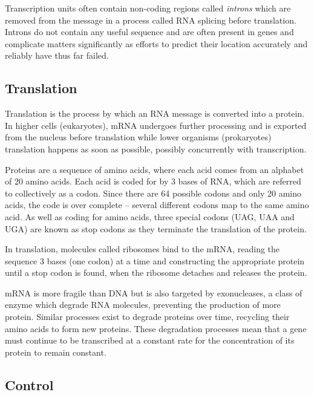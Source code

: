 Transcription units often contain non-coding regions called \textit{introns}
which are removed from the message in a process called RNA splicing 
before translation.
Introns do not contain any useful sequence and are often present in genes and
complicate matters significantly as efforts to predict their location 
accurately and reliably have thus far failed.

\subsection{Translation}
\label{sec:translation}

Translation is the process by which an RNA message is converted into a protein.
In higher cells (eukaryotes), mRNA undergoes further processing and is exported
from the nucleus before translation while lower organisms (prokaryotes)
translation happens as soon as possible, possibly concurrently with
transcription.

Proteins are a sequence of amino acids, where each acid comes from an alphabet
of 20 amino acids.
Each acid is coded for by 3 bases of RNA, which are referred to collectively 
as a codon.
Since there are 64 possible codons and only 20 amino acids, the code is
over complete -- several different codons map to the same amino acid.
As well as coding for amino acids, three special codons (UAG, UAA and UGA) are
known as stop codons as they terminate the translation of the protein.

In translation, molecules called ribosomes bind to the mRNA, reading the
sequence 3 bases (one codon) at a time and constructing the appropriate protein
until a stop codon is found, when the ribosome detaches and releases the
protein.

mRNA is more fragile than DNA but is also targeted by exonucleases, a class of
enzyme which degrade RNA molecules, preventing the production of more protein.
Similar processes exist to degrade proteins over time, recycling their amino
acids to form new proteins.
These degradation processes mean that a gene must continue to be transcribed at
a constant rate for the concentration of its protein to remain constant.

\subsection{Control}
\label{sec:mbio_control}

